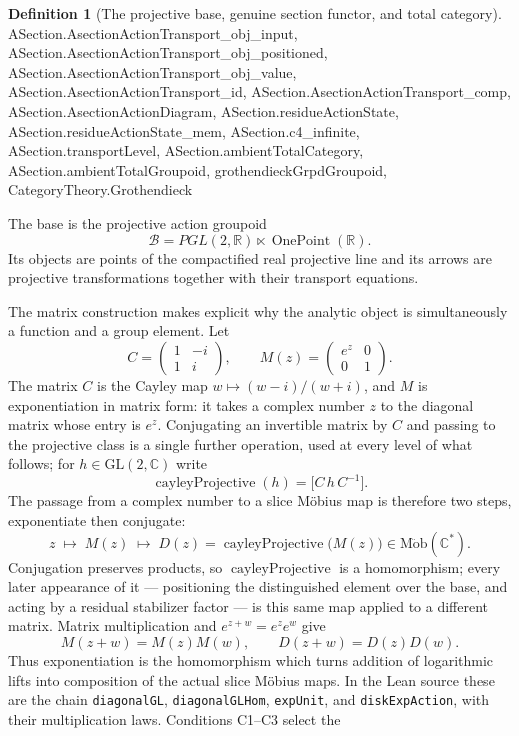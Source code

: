 \documentclass[11pt]{article}
\newcommand{\CC}{\mathbb{C}}
\newcommand{\RR}{\mathbb{R}}
\providecommand{\uses}[1]{}
\theoremstyle{plain}
\theoremstyle{definition}
\newtheorem{definition}[theorem]{Definition}
\theoremstyle{remark}
\begin{document}
\begin{definition}[The projective base, genuine section functor, and total category]
{ASection.AsectionActionTransport_obj_input,
ASection.AsectionActionTransport_obj_positioned,
ASection.AsectionActionTransport_obj_value,
ASection.AsectionActionTransport_id, ASection.AsectionActionTransport_comp,
ASection.AsectionActionDiagram, ASection.residueActionState,
ASection.residueActionState_mem, ASection.c4_infinite,
ASection.transportLevel,
ASection.ambientTotalCategory, ASection.ambientTotalGroupoid,
grothendieckGrpdGroupoid,
CategoryTheory.Grothendieck}
\uses{def:A-section, def:two-worlds, thm:winding-lift, prop:winding-signature}
The base is the projective action groupoid
\[
  \mathcal B
  =PGL(2,\RR)\ltimes\operatorname{OnePoint}(\RR).
\]
Its objects are points of the compactified real projective line and its arrows are projective
transformations together with their transport equations.

The matrix construction makes explicit why the analytic object is simultaneously a function and a
group element. Let
\[
 C=\begin{pmatrix}1&-i\\[2pt]1&i\end{pmatrix},\qquad
 M(z)=\begin{pmatrix}e^z&0\\[2pt]0&1\end{pmatrix}.
\]
The matrix $C$ is the Cayley map $w\mapsto(w-i)/(w+i)$, and $M$ is
exponentiation in matrix form: it takes a complex number $z$ to the diagonal
matrix whose entry is $e^z$. Conjugating an invertible matrix by $C$ and
passing to the projective class is a single further operation, used at every
level of what follows; for $h\in\mathrm{GL}(2,\CC)$ write
\[
  \operatorname{cayleyProjective}(h)=\bigl[C\,h\,C^{-1}\bigr].
\]
The passage from a complex number to a slice M\"obius map is therefore two
steps, exponentiate then conjugate:
\[
  z\;\longmapsto\;M(z)\;\longmapsto\;
  D(z)=\operatorname{cayleyProjective}\bigl(M(z)\bigr)
      \in\operatorname{M\ddot ob}(\CC^*).
\]
Conjugation preserves products, so $\operatorname{cayleyProjective}$ is a
homomorphism; every later appearance of it --- positioning the distinguished
element over the base, and acting by a residual stabilizer factor --- is this
same map applied to a different matrix. Matrix multiplication and
$e^{z+w}=e^ze^w$ give
\[
  M(z+w)=M(z)M(w),\qquad D(z+w)=D(z)D(w).
\]
Thus exponentiation is the homomorphism which turns addition of logarithmic lifts into composition
of the actual slice M\"obius maps. In the Lean source these are the chain
\texttt{diagonalGL}, \texttt{diagonalGLHom}, \texttt{expUnit}, and
\texttt{diskExpAction}, with their multiplication laws. Conditions \textup{C1--C3} select the

\end{definition}
\end{document}
